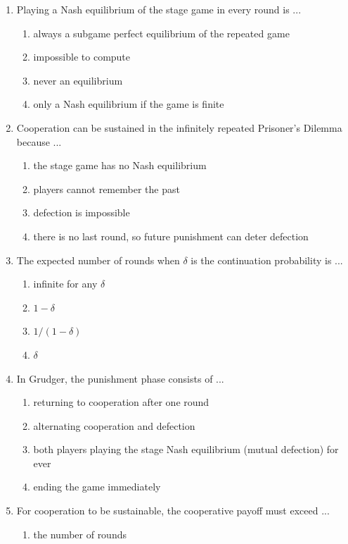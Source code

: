 \documentclass[11pt]{article}
\begin{document}
\begin{enumerate}[itemsep=6pt]
\begin{enumerate}
  \end{enumerate}
  \item Playing a Nash equilibrium of the stage game in every round is ...
  \begin{enumerate}
    \item always a subgame perfect equilibrium of the repeated game
    \item impossible to compute
    \item never an equilibrium
    \item only a Nash equilibrium if the game is finite
  \end{enumerate}
  \item Cooperation can be sustained in the infinitely repeated Prisoner's Dilemma because ...
  \begin{enumerate}
    \item the stage game has no Nash equilibrium
    \item players cannot remember the past
    \item defection is impossible
    \item there is no last round, so future punishment can deter defection
  \end{enumerate}
  \item The expected number of rounds when \(\delta\) is the continuation probability is ...
  \begin{enumerate}
    \item infinite for any \(\delta\)
    \item \(1 - \delta\)
    \item \(1 / (1 - \delta)\)
    \item \(\delta\)
  \end{enumerate}
  \item In Grudger, the punishment phase consists of ...
  \begin{enumerate}
    \item returning to cooperation after one round
    \item alternating cooperation and defection
    \item both players playing the stage Nash equilibrium (mutual defection) for ever
    \item ending the game immediately
  \end{enumerate}
  \item For cooperation to be sustainable, the cooperative payoff must exceed ...
  \begin{enumerate}
    \item the number of rounds

\end{enumerate}
\end{enumerate}
\end{document}
